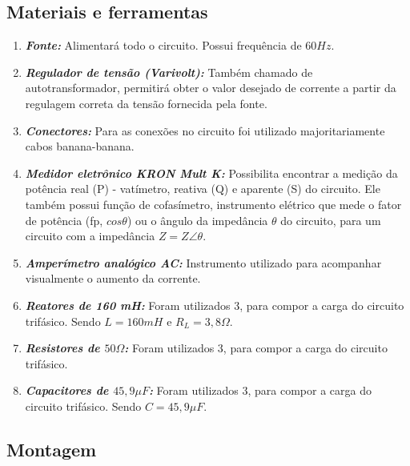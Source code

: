 \documentclass[a4paper,12pt,oneside,openany,table,xcdraw]{article}
\begin{document}
\subsection{Materiais e ferramentas} %
\begin{enumerate}[1 -]
\item \emph{\textbf{Fonte:}}
Alimentará todo o circuito. Possui frequência de $60Hz$.

\item \emph{\textbf{Regulador de tensão (Varivolt):}}
Também chamado de autotransformador, permitirá obter o valor desejado de corrente a partir da regulagem correta da tensão fornecida pela fonte.

\item \emph{\textbf{Conectores:}}
Para as conexões no circuito foi utilizado majoritariamente cabos banana-banana.

\item \emph{\textbf{Medidor eletrônico KRON Mult K:}}
Possibilita encontrar a medição da potência real (P) - vatímetro, reativa (Q) e aparente (S) do circuito. Ele também possui função de cofasímetro, instrumento elétrico que mede o fator de potência (fp, $cos\theta$) ou o ângulo da impedância $\theta$ do circuito, para um circuito com a impedância $Z = Z\angle \theta$.

\item \emph{\textbf{Amperímetro analógico AC:}}
Instrumento utilizado para acompanhar visualmente o aumento da corrente.

\item \emph{\textbf{Reatores de 160 mH:}}
Foram utilizados 3, para compor a carga do circuito trifásico. Sendo $L=160mH$ e $R_L=3,8\Omega$.

\item \emph{\textbf{Resistores de $50\Omega$:}}
Foram utilizados 3, para compor a carga do circuito trifásico.

\item \emph{\textbf{Capacitores de $45,9\mu F$:}}
Foram utilizados 3, para compor a carga do circuito trifásico. Sendo $C= 45,9\mu F$.

\end{enumerate}

\subsection{Montagem} %
\end{document}
